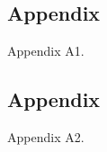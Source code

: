 \renewcommand\thesection{A\arabic{section}}
\renewcommand\thesubsection{A\arabic{subsection}}
\setcounter{figure}{0}
\setcounter{table}{0}

\renewcommand{\thetable}{{A\arabic{table}}}
\renewcommand{\thefigure}{{A\arabic{figure}}}
\renewcommand{\theequation}{{A\arabic{equation}}}

\subsection{Appendix}

Appendix A1.

\subsection{Appendix}

Appendix A2.